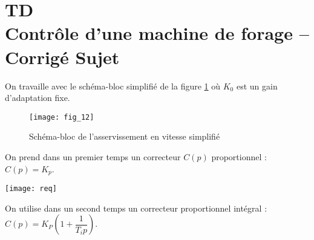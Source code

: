\chapter*{TD  \\ 
Contrôle d'une machine de forage -- 
\ifprof Corrigé \else Sujet \fi}

\iflivret {} \else
\ifprof  {} \else \fi
\fi

\setcounter{question}{0}





On travaille avec le schéma-bloc simplifié de la figure \ref{Cy_02_Ch_04_TD_03_fig_12} où $K_0$ est un gain d’adaptation fixe. 


\begin{figure}[!h]
\texttt{[image: fig\_12]}
\caption{Schéma-bloc de l’asservissement en vitesse simplifié \label{Cy_02_Ch_04_TD_03_fig_12}}
\end{figure}

 On prend dans un premier temps un correcteur $C(p)$ proportionnel : $C(p) = K_p$. 
 
\ifprof
\begin{corrige}
\end{corrige}
\else
\fi


\begin{marginfigure}
\texttt{[image: req]}
\end{marginfigure}

\ifprof
\begin{corrige}
\end{corrige}
\else
\fi

 
On utilise dans un second temps un correcteur proportionnel intégral : $C(p)=K_P\left( 1+\dfrac{1}{T_i p}\right)$.
 
\ifprof
\begin{corrige}
\end{corrige}
\else
\fi

